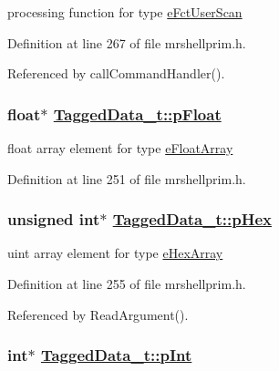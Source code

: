 processing function for type \hyperlink{mrshellprim_8h_76a810650461f2062938ee9b82666b36b17c2f574c8a5697b118c8aa4a00bdad}{e\-Fct\-User\-Scan} 



Definition at line 267 of file mrshellprim.h.

Referenced by call\-Command\-Handler().\hypertarget{structTaggedData__t_6315613fa330301fc9be1da20c50c352}{
\subsubsection[pFloat]{\setlength{\rightskip}{0pt plus 5cm}float$\ast$ \hyperlink{structTaggedData__t_6315613fa330301fc9be1da20c50c352}{Tagged\-Data\_\-t::p\-Float}}}
\label{structTaggedData__t_6315613fa330301fc9be1da20c50c352}


float array element for type \hyperlink{mrshellprim_8h_76a810650461f2062938ee9b82666b361cf54b260432a1baf68bed16081357c7}{e\-Float\-Array} 



Definition at line 251 of file mrshellprim.h.\hypertarget{structTaggedData__t_7128a4892c178f6ab61b642e46b72720}{
\subsubsection[pHex]{\setlength{\rightskip}{0pt plus 5cm}unsigned int$\ast$ \hyperlink{structTaggedData__t_7128a4892c178f6ab61b642e46b72720}{Tagged\-Data\_\-t::p\-Hex}}}
\label{structTaggedData__t_7128a4892c178f6ab61b642e46b72720}


uint array element for type \hyperlink{mrshellprim_8h_76a810650461f2062938ee9b82666b36be303c42da892f2d0101b668e8aa252a}{e\-Hex\-Array} 



Definition at line 255 of file mrshellprim.h.

Referenced by Read\-Argument().\hypertarget{structTaggedData__t_d3d58b0a67cc759b746654b7b9d09ae5}{
\subsubsection[pInt]{\setlength{\rightskip}{0pt plus 5cm}int$\ast$ \hyperlink{structTaggedData__t_d3d58b0a67cc759b746654b7b9d09ae5}{Tagged\-Data\_\-t::p\-Int}}}
\label{structTaggedData__t_d3d58b0a67cc759b746654b7b9d09ae5}


